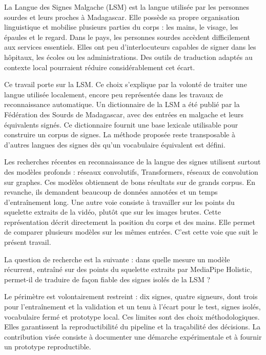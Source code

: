 \begin{introduction}

La Langue des Signes Malgache (LSM) est la langue utilisée par les personnes sourdes et leurs proches à Madagascar. Elle possède sa propre organisation linguistique et mobilise plusieurs parties du corps : les mains, le visage, les épaules et le regard. Dans le pays, les personnes sourdes accèdent difficilement aux services essentiels. Elles ont peu d'interlocuteurs capables de signer dans les hôpitaux, les écoles ou les administrations. Des outils de traduction adaptés au contexte local pourraient réduire considérablement cet écart.

Ce travail porte sur la LSM. Ce choix s'explique par la volonté de traiter une langue utilisée localement, encore peu représentée dans les travaux de reconnaissance automatique. Un dictionnaire de la LSM a été publié par la Fédération des Sourds de Madagascar, avec des entrées en malgache et leurs équivalents signés. Ce dictionnaire fournit une base lexicale utilisable pour construire un corpus de signes. La méthode proposée reste transposable à d'autres langues des signes dès qu'un vocabulaire équivalent est défini.

Les recherches récentes en reconnaissance de la langue des signes utilisent surtout des modèles profonds : réseaux convolutifs, Transformers, réseaux de convolution sur graphes. Ces modèles obtiennent de bons résultats sur de grands corpus. En revanche, ils demandent beaucoup de données annotées et un temps d'entraînement long. Une autre voie consiste à travailler sur les points du squelette extraits de la vidéo, plutôt que sur les images brutes. Cette représentation décrit directement la position du corps et des mains. Elle permet de comparer plusieurs modèles sur les mêmes entrées. C'est cette voie que suit le présent travail.

La question de recherche est la suivante : dans quelle mesure un modèle récurrent, entraîné sur des points du squelette extraits par MediaPipe Holistic, permet-il de traduire de façon fiable des signes isolés de la LSM ?

Le périmètre est volontairement restreint : dix signes, quatre signeurs, dont trois pour l'entraînement et la validation et un tenu à l'écart pour le test, signes isolés, vocabulaire fermé et prototype local. Ces limites sont des choix méthodologiques. Elles garantissent la reproductibilité du pipeline et la traçabilité des décisions. La contribution visée consiste à documenter une démarche expérimentale et à fournir un prototype reproductible.


\end{introduction}
